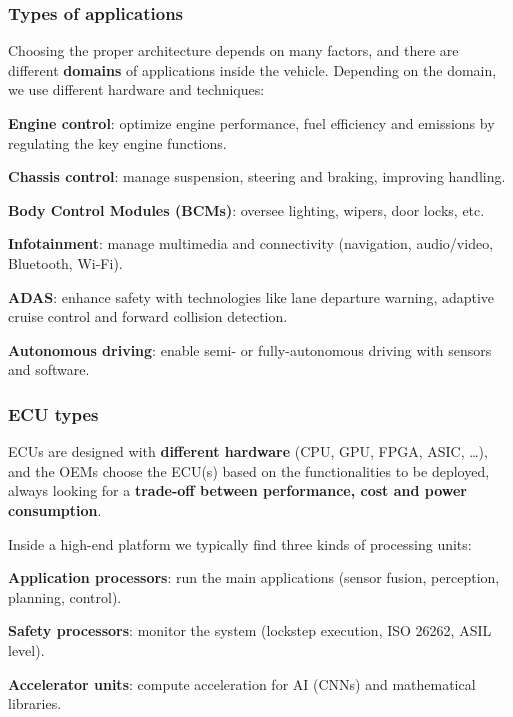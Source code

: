 \subsubsection{Types of applications}
Choosing the proper architecture depends on many factors, and there are different \textbf{domains} of applications inside the vehicle.
Depending on the domain, we use different hardware and techniques:
\begin{compactitemize}
    \item \textbf{Engine control}: optimize engine performance, fuel efficiency and emissions by regulating the key engine functions.
    \item \textbf{Chassis control}: manage suspension, steering and braking, improving handling.
    \item \textbf{Body Control Modules (BCMs)}: oversee lighting, wipers, door locks, etc.
    \item \textbf{Infotainment}: manage multimedia and connectivity (navigation, audio/video, Bluetooth, Wi-Fi).
    \item \textbf{ADAS}: enhance safety with technologies like lane departure warning, adaptive cruise control and forward collision detection.
    \item \textbf{Autonomous driving}: enable semi- or fully-autonomous driving with sensors and software.
\end{compactitemize}

\subsubsection{ECU types}
ECUs are designed with \textbf{different hardware} (CPU, GPU, FPGA, ASIC, \dots), and the OEMs choose the ECU(s) based on the functionalities to be deployed, always looking for a \textbf{trade-off between performance, cost and power consumption}.

Inside a high-end platform we typically find three kinds of processing units:
\begin{compactitemize}
    \item \textbf{Application processors}: run the main applications (sensor fusion, perception, planning, control).
    \item \textbf{Safety processors}: monitor the system (lockstep execution, ISO 26262, ASIL level).
    \item \textbf{Accelerator units}: compute acceleration for AI (CNNs) and mathematical libraries.
\end{compactitemize}

